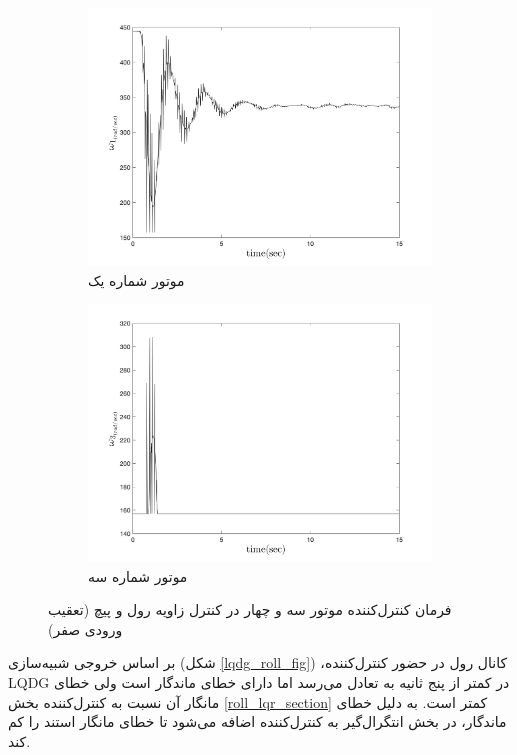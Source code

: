 \begin{figure}
	[width=12cm]
	\centering
	\begin{subfigure}
		\centering
		\includegraphics[width=12cm]{../Figures/Calibration/LQDG/Pitch/lqdg_pitch_Omega_1.png}
		\caption{موتور شماره یک}
	\end{subfigure}
	\begin{subfigure}
		\centering
		\includegraphics[width=12cm]{../Figures/Calibration/LQDG/Pitch/lqdg_pitch_Omega_3.png}
		\caption{موتور شماره سه}
	\end{subfigure}
	\caption{‫‪فرمان کنترل‌کننده موتور سه و چهار در کنترل زاویه رول و پیچ (تعقیب ورودی صفر)}
\end{figure}
بر اساس خروجی شبیه‌سازی (شکل
\ref{lqdg_roll_fig})
،کانال رول در حضور کنترل‌کننده LQDG در کمتر از پنج ثانیه به تعادل می‌رسد اما دارای خطای ماندگار است ولی خطای مانگار آن نسبت به کنترل‌کننده بخش
\ref{roll_lqr_section}
کمتر است. به دلیل خطای ماندگار، در بخش
انتگرال‌گیر به کنترل‌کننده اضافه می‌شود تا خطای مانگار استند را کم کند.
